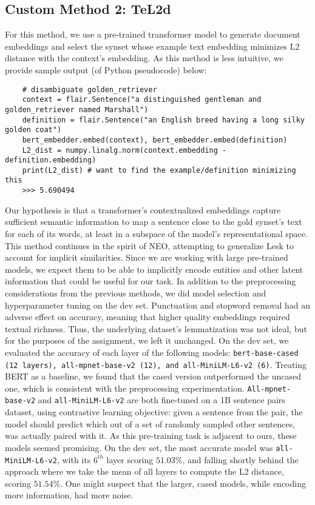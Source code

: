\documentclass[11pt]{article}
\begin{document}
\subsection{Custom Method 2: TeL2d}
\vspace{-1ex}
For this method, we use a pre-trained transformer
model to generate document embeddings and select the synset whose example text 
embedding minimizes L2 distance with the context's embedding. As this method is less 
intuitive, we provide sample output (of Python pseudocode) below:
\vspace{-1ex}
\begin{verbatim}
    # disambiguate golden_retriever
    context = flair.Sentence("a distinguished gentleman and golden_retriever named Marshall")
    definition = flair.Sentence("an English breed having a long silky golden coat")
    bert_embedder.embed(context), bert_embedder.embed(definition)
    L2_dist = numpy.linalg.norm(context.embedding - definition.embedding)
    print(L2_dist) # want to find the example/definition minimizing this
    >>> 5.690494
\end{verbatim}
\vspace{-1ex}
Our hypothesis is that a transformer's contextualized embeddings capture
sufficient semantic information to map a sentence close to the gold synset's
text for each of its words, at least in a subspace of the model's representational space.
This method continues in the spirit of NEO, attempting to generalize Lesk 
to account for implicit similarities. Since we are working with large pre-trained 
models, we expect them to be able to implicitly encode entities and other latent information
that could be useful for our task. In addition to the preprocessing considerations from the previous methods, 
we did model selection and hyperparameter tuning on the dev set.
Punctuation and stopword removal had an adverse effect on accuracy, meaning that 
higher quality embeddings required textual richness. 
Thus, the underlying dataset's lemmatization was not ideal, but 
for the purposes of the assignment, we left it unchanged. 
On the dev set, we evaluated the accuracy of each layer of the following models: 
\texttt{bert-base-cased (12 layers), all-mpnet-base-v2 (12), and all-MiniLM-L6-v2 (6)}. 
Treating BERT as a baseline, we found that the cased version outperformed the uncased one, 
which is consistent with the preprocessing experimentation. \texttt{All-mpnet-base-v2} and \texttt{all-MiniLM-L6-v2} 
are both fine-tuned on a 1B sentence pairs dataset, using contrastive learning objective: 
given a sentence from the pair, the model should predict which out of a set of randomly sampled other sentences, 
was actually paired with it. As this pre-training task is adjacent to ours, these models seemed promising.
On the dev set, the most accurate model was \texttt{all-MiniLM-L6-v2}, with its $6^{th}$ layer scoring $51.03$\%,
and falling shortly behind the approach where we take the mean of all layers to compute the L2 distance, scoring $51.54\%$.
One might suspect that the larger, cased models, while encoding more information, had more noise.
\end{document}

